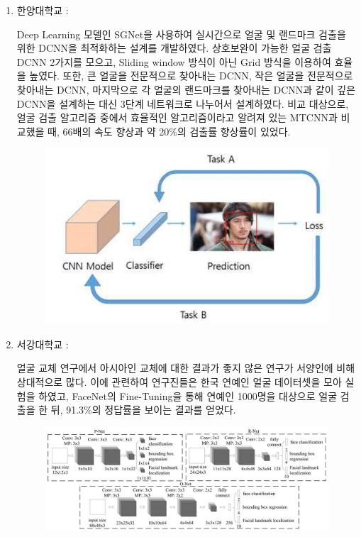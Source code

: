 \documentclass[chapter,oneside]{oblivoir}
\begin{document}
\begin{enumerate}%
    \item 한양대학교 :

    Deep Learning 모델인 SGNet을 사용하여 실시간으로 얼굴 및 랜드마크 검출을 위한 DCNN을 최적화하는 설계를 개발하였다. 
    상호보완이 가능한 얼굴 검출 DCNN 2가지를 모으고, Sliding window 방식이 아닌 Grid 방식을 이용하여 효율을 높였다. 
    또한, 큰 얼굴을 전문적으로 찾아내는 DCNN, 작은 얼굴을 전문적으로 찾아내는 DCNN, 마지막으로 각 얼굴의 랜드마크를 찾아내는 DCNN과
    같이 깊은 DCNN을 설계하는 대신 3단계 네트워크로 나누어서 설계하였다. 비교 대상으로, 
    얼굴 검출 알고리즘 중에서 효율적인 알고리즘이라고 알려져 있는 MTCNN과 비교했을 때, 66배의 속도 향상과 약 20\%의 검출률 향상률이 있었다.

    \begin{figure}[h!]
        \centering
        \includegraphics[scale = 0.7]{pic/chp1/img522}
    \end{figure}

    \item 서강대학교 : 

    얼굴 교체 연구에서 아시아인 교체에 대한 결과가 좋지 않은 연구가 서양인에 비해 상대적으로 많다.
    이에 관련하여 연구진들은 한국 연예인 얼굴 데이터셋을 모아 실험을 하였고, 
    FaceNet의 Fine-Tuning을 통해 연예인 1000명을 대상으로 얼굴 검출을 한 뒤, 
    91.3\%의 정답률을 보이는 결과를 얻었다.

    \begin{figure}[h!]
        \centering
        \includegraphics[scale = 0.7]{pic/chp1/img523}
    \end{figure}


\end{enumerate}
\end{document}
